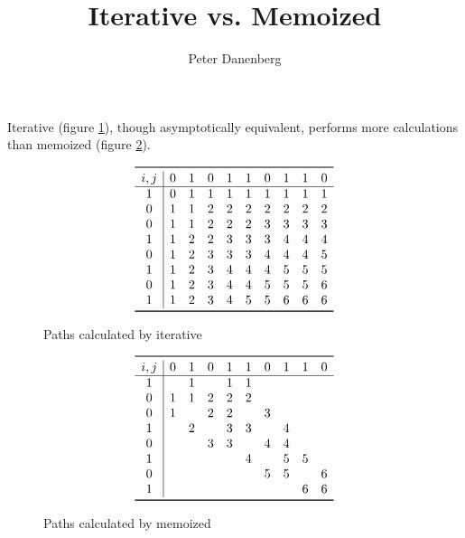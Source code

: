 \documentclass{article}
\title{Iterative vs. Memoized \proc{Matrix-Chain}}
\author{Peter Danenberg}
\begin{document}
\maketitle

Iterative  (figure \ref{fig:iter}), though
asymptotically equivalent, performs more calculations than
memoized  (figure \ref{fig:memo}).
\begin{figure}[ht]
  \[
    \begin{array}{c|ccccccccc}
      \toprule i, j
      & 0 & 1 & 0 & 1 & 1 & 0 & 1 & 1 & 0\\
      \hline
      1 & 0 & 1 & 1 & 1 & 1 & 1 & 1 & 1 & 1\\
      0 & 1 & 1 & 2 & 2 & 2 & 2 & 2 & 2 & 2\\
      0 & 1 & 1 & 2 & 2 & 2 & 3 & 3 & 3 & 3\\
      1 & 1 & 2 & 2 & 3 & 3 & 3 & 4 & 4 & 4\\
      0 & 1 & 2 & 3 & 3 & 3 & 4 & 4 & 4 & 5\\
      1 & 1 & 2 & 3 & 4 & 4 & 4 & 5 & 5 & 5\\
      0 & 1 & 2 & 3 & 4 & 4 & 5 & 5 & 5 & 6\\
      1 & 1 & 2 & 3 & 4 & 5 & 5 & 6 & 6 & 6\\
      \bottomrule
    \end{array}
    \]
  \caption{Paths calculated by iterative }
  \label{fig:iter}
\end{figure}
\begin{figure}[ht]
  \[
    \begin{array}{c|cccccccccc}
      \toprule i, j
      & 0 & 1 & 0 & 1 & 1 & 0 & 1 & 1 & 0\\
      \hline
      1 & \, & 1 & \, & 1 & 1 & \, & \, & \, & \,\\
      0 & 1 & 1 & 2 & 2 & 2 & \, & \, & \, & \,\\
      0 & 1 & \, & 2 & 2 & \, & 3 & \, & \, & \,\\
      1 & \, & 2 & \, & 3 & 3 & \, & 4 & \, & \,\\
      0 & \, & \, & 3 & 3 & \, & 4 & 4 & \, & \,\\
      1 & \, & \, & \, & \, & 4 & \, & 5 & 5 & \,\\
      0 & \, & \, & \, & \, & \, & 5 & 5 & \, & 6\\
      1 & \, & \, & \, & \, & \, & \, & \, & 6 & 6\\
      \bottomrule
    \end{array}
    \]
  \caption{Paths calculated by memoized }
  \label{fig:memo}
\end{figure}
\end{document}
